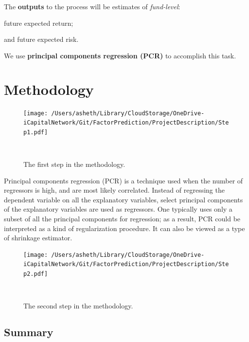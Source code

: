 \documentclass{ledger}
\begin{document}
The \textbf{outputs} to the process will be estimates of \textit{fund-level}:
\begin{compactenum}[$\bullet$]
	\item  future expected return;
	\item  and future expected risk.
\end{compactenum}

We use \textbf{principal components regression (PCR)} to accomplish this task. 

\section{Methodology}
\begin{figure}[!ht]
\centering
	\texttt{[image: /Users/asheth/Library/CloudStorage/OneDrive-iCapitalNetwork/Git/FactorPrediction/ProjectDescription/Step1.pdf]}
	\caption{The first step in the methodology.} ~\\
\end{figure}

Principal components regression (PCR) is a technique used when the number of regressors is high, and are most likely correlated. Instead of regressing the dependent variable on all the explanatory variables, select principal components of the explanatory variables are used as regressors. One typically uses only a subset of all the principal components for regression; as a result, PCR could be interpreted as a kind of regularization procedure. It can also be viewed as a type of shrinkage estimator. \\

\begin{figure}[!ht]
\centering
	\texttt{[image: /Users/asheth/Library/CloudStorage/OneDrive-iCapitalNetwork/Git/FactorPrediction/ProjectDescription/Step2.pdf]}
	\caption{The second step in the methodology.} ~\\
\end{figure}

\subsection{Summary}
\end{document}
